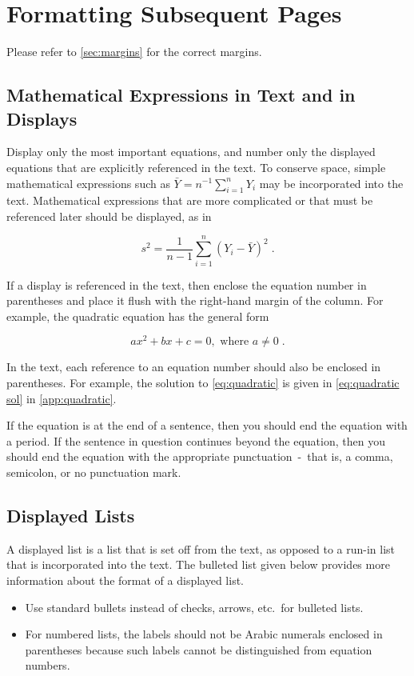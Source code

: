 \documentclass{scspaperproc}
\theoremstyle{scsthe}
\begin{document}
\section{Formatting Subsequent Pages}
Please refer to \autoref{sec:margins} for the correct margins.

\subsection{Mathematical Expressions in Text and in Displays}
Display only the most important equations, and number only the displayed equations that are explicitly referenced in the text. To conserve space, simple mathematical expressions such as \mbox{$\bar Y = n^{-1} \sum_{i=1}^n Y_i$} may be incorporated into the text. Mathematical expressions that are more complicated or that must be referenced later should be displayed, as in

\begin{equation}
s^2 = \frac 1 {n-1} \sum_{i=1}^n (Y_i - \bar Y)^2\;. \nonumber
\end{equation}

If a display is referenced in the text, then enclose the equation number in parentheses and place it flush with the right-hand margin of the column. For example, the quadratic equation has the general form

\begin{equation} \label{eq:quadratic}
ax^2 + bx + c = 0, \mbox{ where } a \ne 0\;.
\end{equation}

In the text, each reference to an equation number should also be enclosed in parentheses. For example, the solution to \eqref{eq:quadratic} is given in \eqref{eq:quadratic sol} in \autoref{app:quadratic}.

If the equation is at the end of a sentence, then you should end the equation with a period. If the sentence in question continues beyond the equation, then you should end the equation with the appropriate punctuation~-~that is, a comma, semicolon, or no punctuation mark.


\subsection{Displayed Lists}
A displayed list is a list that is set off from the text, as opposed to a run-in list that is incorporated into the text. The bulleted list given below provides more information about the format of a displayed list. 
\begin{itemize}
	\item Use standard bullets instead of checks, arrows, etc.\ for bulleted lists.
	\item For numbered lists, the labels should not be Arabic numerals enclosed in parentheses because such labels cannot be distinguished from equation numbers.
\end{itemize}
\end{document}

